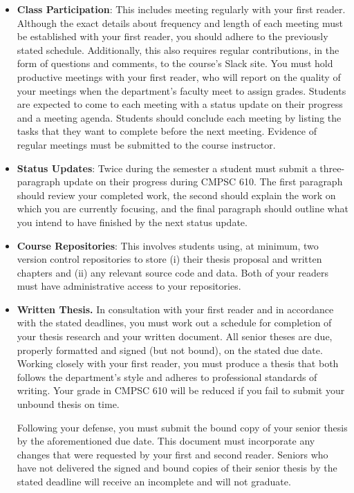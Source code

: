 \begin{itemize}
  \itemsep -.25em

  \item {\bf Class Participation}: This includes meeting regularly with your first reader. Although the exact details
    about frequency and length of each meeting must be established with your first reader, you should adhere to the
    previously stated schedule. Additionally, this also requires regular contributions, in the form of questions and
    comments, to the course's Slack site. You must hold productive meetings with your first reader, who will report on
    the quality of your meetings when the department's faculty meet to assign grades.  Students are expected to come to
    each meeting with a status update on their progress and a meeting agenda.  Students should conclude each meeting by
    listing the tasks that they want to complete before the next meeting. Evidence of regular meetings must be submitted
    to the course instructor.

  \item {\bf Status Updates}: Twice during the semester a student must submit a three-paragraph update on their progress
    during CMPSC 610. The first paragraph should review your completed work, the second should explain the work on which
    you are currently focusing, and the final paragraph should outline what you intend to have finished by the next
    status update.

  \item {\bf Course Repositories}: This involves students using, at minimum, two version control repositories to
    store (i) their thesis proposal and written chapters and (ii) any relevant source code and data.  Both of your
    readers must have administrative access to your repositories.

  \item {\bf Written Thesis.} In consultation with your first reader and in accordance with the stated deadlines, you
    must work out a schedule for completion of your thesis research and your written document. All senior theses are
    due, properly formatted and signed (but not bound), on the stated due date.  Working closely with your first reader,
    you must produce a thesis that both follows the department's style and adheres to professional standards of writing.
    Your grade in CMPSC 610 will be reduced if you fail to submit your unbound thesis on time.

    Following your defense, you must submit the bound copy of your senior thesis by the aforementioned due date.  This
    document must incorporate any changes that were requested by your first and second reader. Seniors who have not
    delivered the signed and bound copies of their senior thesis by the stated deadline will receive an
    incomplete and will not graduate.


\end{itemize}
